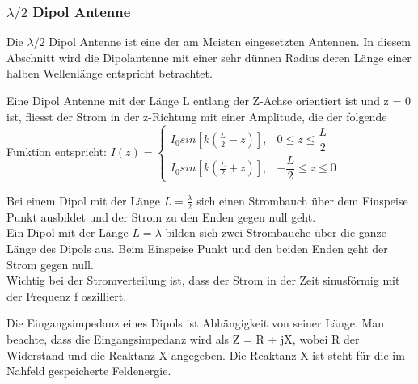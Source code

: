 \subsubsection{$\lambda /2 $ Dipol Antenne}
Die $\lambda /2 $ Dipol Antenne ist eine der am Meisten eingesetzten Antennen. In diesem Abschnitt wird die Dipolantenne mit einer sehr dünnen Radius  deren Länge einer halben Wellenlänge entspricht betrachtet. 

Eine Dipol Antenne mit der Länge L entlang der Z-Achse orientiert ist und z = 0 ist, fliesst der Strom in der z-Richtung mit einer Amplitude, die der folgende Funktion entspricht:
$I(z)=\begin{cases}I_{0}sin[k(\frac{L}{2}-z)],& 0\le z \le \dfrac{L}{2} \\ I_{0}sin[k(\frac{L}{2}+z)], & -\dfrac{L}{2} \le z \le 0 \end{cases}$


Bei einem Dipol mit der Länge  $L= \frac{\lambda}{2}$ sich einen Strombauch über dem Einspeise Punkt ausbildet und der Strom zu den Enden gegen null geht.\\
Ein Dipol mit der Länge  $L= \lambda$ bilden sich zwei  Strombauche über die ganze Länge des Dipols aus. Beim Einspeise Punkt und den beiden Enden geht der Strom gegen null.\\
Wichtig bei der Stromverteilung ist, dass der Strom  in der Zeit sinusförmig  mit der Frequenz f oszilliert. 



Die Eingangsimpedanz eines Dipols ist Abhängigkeit von seiner Länge. Man beachte, dass die Eingangsimpedanz wird als Z = R + jX, wobei R der Widerstand und die Reaktanz X angegeben. Die Reaktanz X ist steht für die im Nahfeld gespeicherte Feldenergie.


